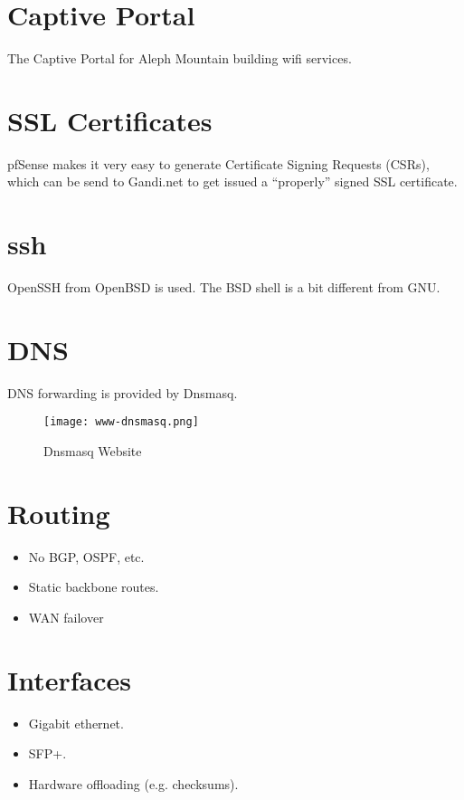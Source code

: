 \section{Captive Portal}
The Captive Portal for Aleph Mountain building wifi services.


\section{SSL Certificates}
pfSense makes it very easy to generate Certificate Signing Requests (CSRs),
which can be send to Gandi.net to get issued a ``properly'' signed SSL
certificate.


\section{ssh}
OpenSSH from OpenBSD is used. The BSD shell is a bit different from GNU.


\section{DNS}
DNS forwarding is provided by Dnsmasq.

\begin{figure}[h!]
\begin{center}
\texttt{[image: www-dnsmasq.png]}
 \caption{Dnsmasq Website}
 \label{fig:www-dnsmasq}
\end{center}
\end{figure}



\section{Routing}
\begin{itemize}
 \item No BGP, OSPF, etc.
 \item Static backbone routes.
 \item WAN failover
\end{itemize}


\section{Interfaces}

\begin{itemize}
 \item Gigabit ethernet.
 \item SFP+.
 \item Hardware offloading (e.g. checksums).
\end{itemize}


